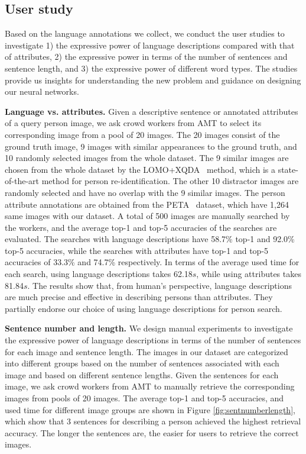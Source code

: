 \subsection{User study}
\label{sec:userstudy}
Based on the language annotations we collect, we conduct the user studies to investigate 1) the expressive power of language descriptions compared with that of attributes, 2) the expressive power in terms of the number of sentences and sentence length, and 3) the expressive power of different word types. The studies provide us insights for understanding the new problem and guidance on designing our neural networks.

\textbf{Language vs. attributes.} Given a descriptive sentence or annotated attributes of a query person image, we ask crowd workers from AMT to select its corresponding image from a pool of 20 images. The 20 images consist of the ground truth image, 9 images with similar appearances to the ground truth, and 10 randomly selected images from the whole dataset. The 9 similar images are chosen from the whole dataset by the LOMO+XQDA~\cite{liao2015person} method, which is a state-of-the-art method for person re-identification. The other 10 distractor images are randomly selected and have no overlap with the 9 similar images. The person attribute annotations are obtained from the PETA~\cite{deng2014pedestrian} dataset, which have 1,264 same images with our dataset. A total of 500 images are manually searched by the workers, and the average top-1 and top-5 accuracies of the searches are evaluated. The searches with language descriptions have 58.7\% top-1 and 92.0\% top-5 accuracies, while the searches with attributes have top-1 and top-5 accuracies of 33.3\% and 74.7\% respectively. In terms of the average used time for each search, using language descriptions takes 62.18$s$, while using attributes takes 81.84$s$.
The results show that, from human's perspective, language descriptions are much precise and effective in describing persons than attributes. They partially endorse our choice of using language descriptions for person search.

\textbf{Sentence number and length.} We design manual experiments to investigate the expressive power of language descriptions in terms of the number of sentences for each image and sentence length. The images in our dataset are categorized into different groups based on the number of sentences associated with each image and based on different sentence lengths. Given the sentences for each image, we ask crowd workers from AMT to manually retrieve  the corresponding images from pools of 20 images.
The average top-1 and top-5 accuracies, and used time for different image groups are shown in Figure \ref{fig:sentnumberlength}, which show that 3 sentences for describing a person achieved the highest retrieval accuracy. The longer the sentences are, the easier for users to retrieve the correct images.


